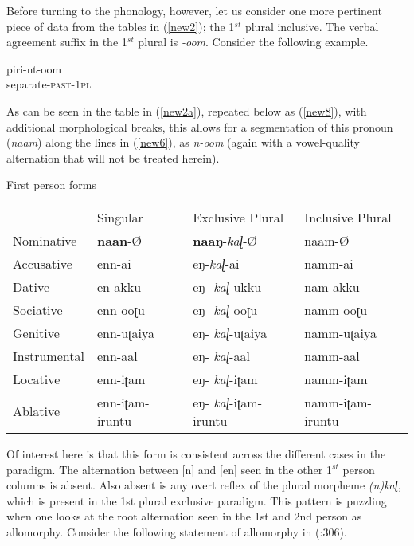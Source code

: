 \documentclass[output=paper,colorlinks,citecolor=brown,
]{langscibook}
\begin{document}
Before turning to the phonology, however, let us consider one more pertinent piece of data from the tables in (\ref{new2}); the 1$^{st}$ plural inclusive. The verbal agreement suffix in the 1$^{st}$ plural is \textit{-oom}. Consider the following example.

\begin{exe}
\ex \label{new7}
\gll piri-nt-oom \\
separate-\textsc{past-1pl}   \\
\end{exe}

As can be seen in the table in (\ref{new2a}), repeated below as (\ref{new8}), with additional morphological breaks, this allows for a segmentation of this pronoun (\textit{naam}) along the lines in (\ref{new6}), as \textit{n-oom} (again with a vowel-quality alternation that will not be treated herein).

\begin{exe} 
\ex \label{new8} First person forms
\\
\begin{tabular}{llll}
             & Singular        & Exclusive Plural      & Inclusive Plural \\
Nominative   & \textbf{naan}-Ø          & \textbf{naaŋ}-\textit{kaɭ}-Ø            & naam-Ø           \\
Accusative   & enn-ai          & eŋ-\textit{kaɭ}-ai             & namm-ai          \\
Dative       & en-akku         & eŋ-   \textit{kaɭ}-ukku        & nam-akku         \\
Sociative    & enn-ooʈu        & eŋ-   \textit{kaɭ}-ooʈu        & namm-ooʈu        \\
Genitive     & enn-uʈaiya      & eŋ-   \textit{kaɭ}-uʈaiya      & namm-uʈaiya      \\
Instrumental & enn-aal         & eŋ-   \textit{kaɭ}-aal         & namm-aal         \\
Locative     & enn-iʈam        & eŋ-   \textit{kaɭ}-iʈam        & namm-iʈam        \\
Ablative     & enn-iʈam-iruntu & eŋ-   \textit{kaɭ}-iʈam-iruntu & namm-iʈam-iruntu
\end{tabular}
\end{exe}

Of interest here is that this form is consistent across the different cases in the paradigm. The alternation between [n] and [en] seen in the other 1$^{st}$ person columns is absent. Also absent is any overt reflex of the plural morpheme \textit{(n)kaɭ}, which is present in the 1st plural exclusive paradigm. This pattern is puzzling when one looks at the root alternation seen in the 1st and 2nd person as allomorphy. Consider the following statement of allomorphy in \citeauthor{moskal2016towards} (\citeyear{moskal2016towards}:306).
\end{document}
